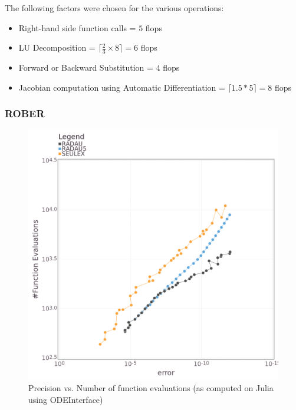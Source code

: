 \documentclass[notitlepage,12pt]{article}
\begin{document}
The following factors were chosen for the various operations:
\begin{itemize}
\item Right-hand side function calls = $5$ flops
\item LU Decomposition = $\lceil \frac{2}{3}\times 8\rceil = 6$ flops
\item Forward or Backward Substitution = $4$ flops
\item Jacobian computation using Automatic Differentiation = $\lceil 1.5*5 \rceil = 8$ flops
\end{itemize}


\subsubsection{ROBER}
\begin{figure}[H]
\centering
\includegraphics[scale=0.4]{../ImagesAndPDFs/Plots/RoberPrecisionTest.png}
\caption{Precision vs. Number of function evaluations (as computed on Julia using ODEInterface)}
\label{fig:roberJulia}
\end{figure}
\end{document}
